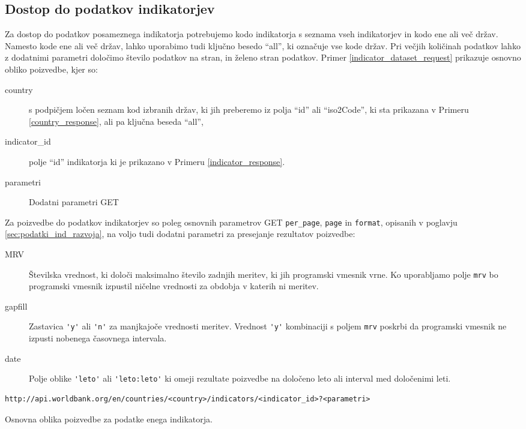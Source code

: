 \subsection{Dostop do podatkov indikatorjev}

Za dostop do podatkov posameznega indikatorja potrebujemo kodo
indikatorja s seznama vseh indikatorjev in kodo ene ali več držav. Namesto
kode ene ali več držav, lahko uporabimo tudi ključno besedo ``all'', ki
označuje vse kode držav. Pri večjih količinah podatkov lahko z dodatnimi
parametri določimo število podatkov na stran, in želeno stran podatkov.
Primer \ref{indicator_dataset_request} prikazuje osnovno obliko poizvedbe,
kjer so:
\begin{description}
\item [country] s podpičjem ločen seznam kod izbranih držav, ki jih 
	  preberemo iz polja ``id'' ali ``iso2Code'', ki sta prikazana v Primeru 
    \ref{country_response}, ali pa ključna beseda ``all'',
\item [indicator\_id] polje ``id'' indikatorja ki je prikazano v Primeru 
    \ref{indicator_response}.
\item [parametri] Dodatni parametri GET 
\end{description}
Za poizvedbe do podatkov indikatorjev so poleg osnovnih parametrov GET 
\verb|per_page|, \verb|page| in \verb|format|, opisanih v poglavju 
\ref{sec:podatki_ind_razvoja}, na voljo tudi dodatni parametri za presejanje
rezultatov poizvedbe:
\begin{description}  
\item [MRV] Številska vrednost, ki določi maksimalno število zadnjih meritev,
    ki jih programski vmesnik vrne. Ko uporabljamo polje \verb|mrv| bo 
    programski vmesnik izpustil ničelne vrednosti za obdobja v katerih ni
    meritev.
\item [gapfill] Zastavica \verb|'y'| ali \verb|'n'| za manjkajoče vrednosti meritev.
    Vrednost \verb|'y'| kombinaciji s poljem \verb|mrv| poskrbi da programski 
    vmesnik ne izpusti nobenega časovnega intervala.
\item [date] Polje oblike \verb|'leto'| ali \verb|'leto:leto'| ki omeji rezultate poizvedbe
    na določeno leto ali interval med določenimi leti. 
\end{description}


\begin{snippet}
\begin{center}
\begin{lstlisting}
http://api.worldbank.org/en/countries/<country>/indicators/<indicator_id>?<parametri>
\end{lstlisting}
\end{center}
\caption{Osnovna oblika poizvedbe za podatke enega indikatorja.}
\label{indicator_dataset_request}
\end{snippet} 

